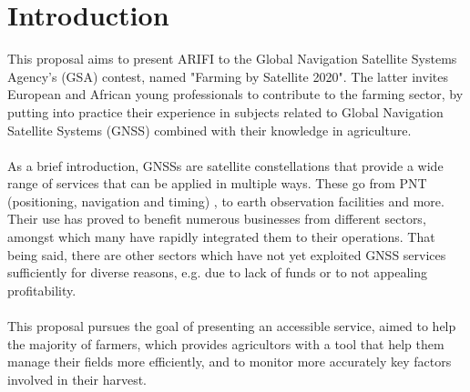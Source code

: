 \section{Introduction}
This proposal aims to present ARIFI to the Global Navigation Satellite Systems Agency's (GSA) contest, named "Farming by Satellite 2020". The latter invites European and African young professionals to contribute to the farming sector, by putting into practice their experience in subjects related to Global Navigation Satellite Systems (GNSS) combined with their knowledge in agriculture.\\\\%
%
%
As a brief introduction, GNSSs are satellite constellations that provide a wide range of services that can be applied in multiple ways. These go from PNT (positioning, navigation and timing) , to earth observation facilities and more. Their use has proved to benefit numerous businesses from different sectors, amongst which many have rapidly integrated them to their operations. That being said, there are other sectors which have not yet exploited GNSS services sufficiently for diverse reasons, e.g. due to lack of funds or to not appealing profitability.\\\\
% 
%
This proposal pursues the goal of presenting an accessible service, aimed to help the majority of farmers, which provides agricultors with a tool that help them manage their fields more efficiently, and to monitor more accurately key factors involved in their harvest. 



